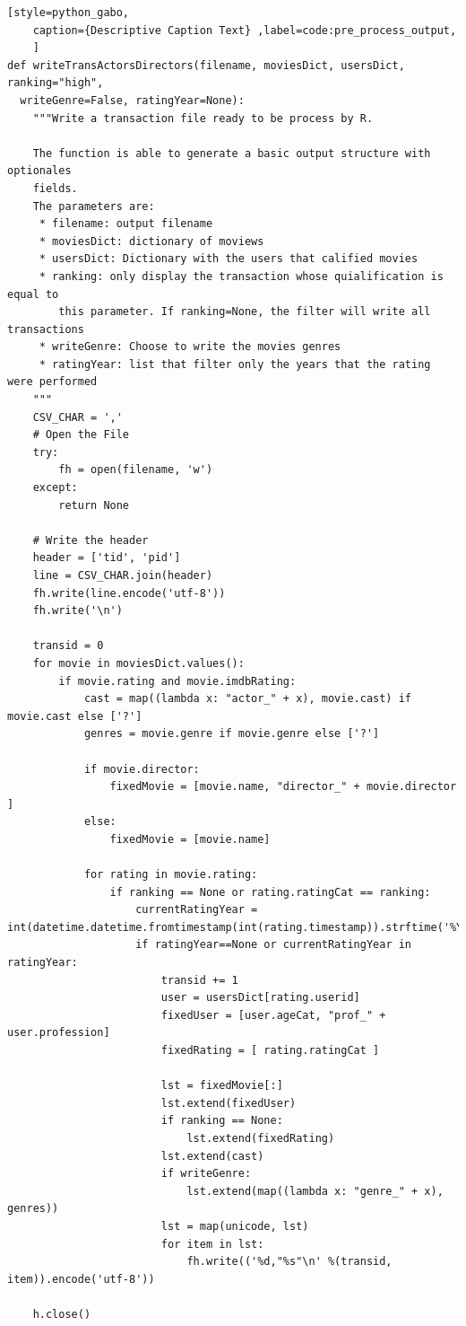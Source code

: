 \documentclass[journal]{IEEEtran}
\begin{document}
\begin{lstlisting}[style=python_gabo,
	caption={Descriptive Caption Text} ,label=code:pre_process_output,
	]
def writeTransActorsDirectors(filename, moviesDict, usersDict, ranking="high",
  writeGenre=False, ratingYear=None):
    """Write a transaction file ready to be process by R.

    The function is able to generate a basic output structure with optionales
    fields. 
    The parameters are:
     * filename: output filename 
     * moviesDict: dictionary of moviews
     * usersDict: Dictionary with the users that calified movies
     * ranking: only display the transaction whose quialification is equal to
        this parameter. If ranking=None, the filter will write all transactions
     * writeGenre: Choose to write the movies genres
     * ratingYear: list that filter only the years that the rating were performed
    """
    CSV_CHAR = ','
    # Open the File
    try:
        fh = open(filename, 'w')
    except:
        return None

    # Write the header
    header = ['tid', 'pid']
    line = CSV_CHAR.join(header)
    fh.write(line.encode('utf-8'))
    fh.write('\n')

    transid = 0
    for movie in moviesDict.values():
        if movie.rating and movie.imdbRating:
            cast = map((lambda x: "actor_" + x), movie.cast) if movie.cast else ['?']
            genres = movie.genre if movie.genre else ['?']

            if movie.director:
                fixedMovie = [movie.name, "director_" + movie.director ]
            else:
                fixedMovie = [movie.name]

            for rating in movie.rating:
                if ranking == None or rating.ratingCat == ranking:
                    currentRatingYear = int(datetime.datetime.fromtimestamp(int(rating.timestamp)).strftime('%Y'))
                    if ratingYear==None or currentRatingYear in ratingYear:
                        transid += 1
                        user = usersDict[rating.userid]
                        fixedUser = [user.ageCat, "prof_" + user.profession]
                        fixedRating = [ rating.ratingCat ]

                        lst = fixedMovie[:]
                        lst.extend(fixedUser)
                        if ranking == None:
                            lst.extend(fixedRating)
                        lst.extend(cast)
                        if writeGenre:
                            lst.extend(map((lambda x: "genre_" + x), genres))
                        lst = map(unicode, lst)
                        for item in lst:
                            fh.write(('%d,"%s"\n' %(transid, item)).encode('utf-8'))

    h.close()
\end{lstlisting}
\end{document}
